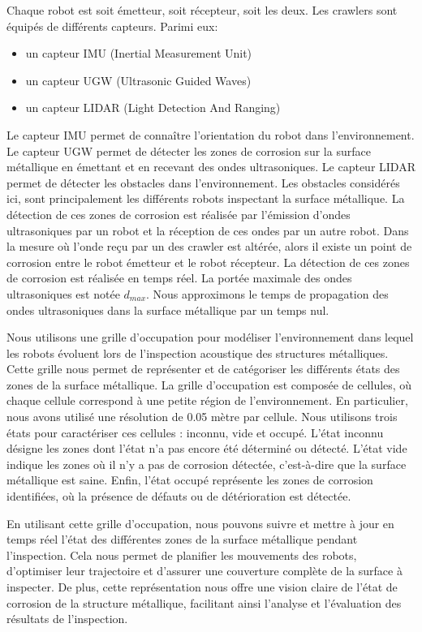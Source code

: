 \documentclass[francais,RandD]{rapportPFE}
\begin{document}
			Chaque robot est soit émetteur, soit récepteur, soit les deux.
			Les crawlers sont équipés de différents capteurs.
			Parimi eux:
			\begin{itemize}
				\item un capteur IMU (Inertial Measurement Unit)
				\item un capteur UGW (Ultrasonic Guided Waves)
				\item un capteur LIDAR (Light Detection And Ranging)
			\end{itemize}
			Le capteur IMU permet de connaître l'orientation du robot dans l'environnement.
			Le capteur UGW permet de détecter les zones de corrosion sur la surface métallique en émettant et en recevant des ondes ultrasoniques.
			Le capteur LIDAR permet de détecter les obstacles dans l'environnement.
			Les obstacles considérés ici, sont principalement les différents robots inspectant la surface métallique.
			La détection de ces zones de corrosion est réalisée par l'émission d'ondes ultrasoniques par un robot et la réception de ces ondes par un autre robot.
			Dans la mesure où l'onde reçu par un des crawler est altérée, alors il existe un point de corrosion entre le robot émetteur et le robot récepteur.
			La détection de ces zones de corrosion est réalisée en temps réel.
			La portée maximale des ondes ultrasoniques est notée $d_{max}$.
			Nous approximons le temps de propagation des ondes ultrasoniques dans la surface métallique par un temps nul.

			Nous utilisons une grille d'occupation pour modéliser l'environnement dans lequel les robots évoluent lors de l'inspection acoustique des structures métalliques.
			Cette grille nous permet de représenter et de catégoriser les différents états des zones de la surface métallique.
			La grille d'occupation est composée de cellules, où chaque cellule correspond à une petite région de l'environnement.
			En particulier, nous avons utilisé une résolution de 0.05 mètre par cellule.
			Nous utilisons trois états pour caractériser ces cellules : inconnu, vide et occupé.
			L'état inconnu désigne les zones dont l'état n'a pas encore été déterminé ou détecté.
			L'état vide indique les zones où il n'y a pas de corrosion détectée, c'est-à-dire que la surface métallique est saine.
			Enfin, l'état occupé représente les zones de corrosion identifiées, où la présence de défauts ou de détérioration est détectée.

			En utilisant cette grille d'occupation, nous pouvons suivre et mettre à jour en temps réel l'état des différentes zones de la surface métallique pendant l'inspection.
			Cela nous permet de planifier les mouvements des robots, d'optimiser leur trajectoire et d'assurer une couverture complète de la surface à inspecter.
			De plus, cette représentation nous offre une vision claire de l'état de corrosion de la structure métallique, facilitant ainsi l'analyse et l'évaluation des résultats de l'inspection.
\end{document}
